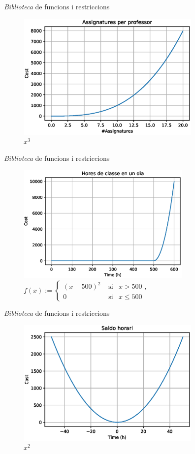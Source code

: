 \documentclass[twocolumn]{beamer}
\begin{document}
\begin{frame}{\textit{Biblioteca} de funcions i restriccions}
\begin{figure}
	\includegraphics[width=9cm]{Assignatures}
	\caption{$x^3$}
\end{figure}
\end{frame}

\begin{frame}{\textit{Biblioteca} de funcions i restriccions}
\begin{figure}
	\includegraphics[width=8.5cm]{hores_dia}
	\caption{
	$f(x):=\left\lbrace 
	\begin{matrix}
		(x-500)^2& \text{ si}& x>500\text{ ,} \\
		0& \text{ si}& x\leq 500& \end{matrix}
	\right.$
	}
\end{figure}
\end{frame}

\begin{frame}{\textit{Biblioteca} de funcions i restriccions}
\begin{figure}
	\includegraphics[width=9cm]{saldo}
	\caption{$x^2$}
\end{figure}
\end{frame}
\end{document}
